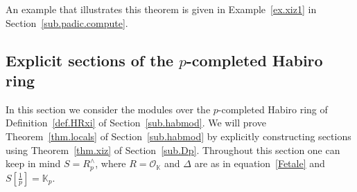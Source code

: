 \documentclass[12pt,reqno]{amsart}
\newcounter{theoremcount}
\newtheorem{theorem}[theoremcount]{Theorem}
\theoremstyle{definition}
\def\BK{\mathbb K}
\def\calH{\mathcal H}
\def\ve{\varepsilon}
\def\be{\begin{equation}}
\def\ee{\end{equation}}
\def\z{\zeta}
\def\calO{\mathcal{O}}
\def\={\;=\;}
\def\fr{\mathrm{\varphi}_p}
\begin{document}
\noindent An example that illustrates this theorem is given in Example~\ref{ex.xiz1} in
Section~\ref{sub.padic.compute}.

\subsection{\texorpdfstring{Explicit sections of the $p$-completed
    Habiro ring}{Explicit sections of the p-completed Habiro ring}}
\label{sub.habp}

In this section we consider the modules over the $p$-completed Habiro ring
of Definition~\ref{def.HRxi} of Section~\ref{sub.habmod}. We will prove
Theorem~\ref{thm.locals} of Section~\ref{sub.habmod} by explicitly constructing
sections using Theorem~\ref{thm.xiz} of Section~\ref{sub.Dp}.
Throughout this section one can keep in mind $S=R^\wedge_{p}$, where $R=\calO_{\BK}$
and $\Delta$ are as in equation~\eqref{Fetale} and $S[\tfrac{1}{p}]=\BK_{p}$.
\end{document}
